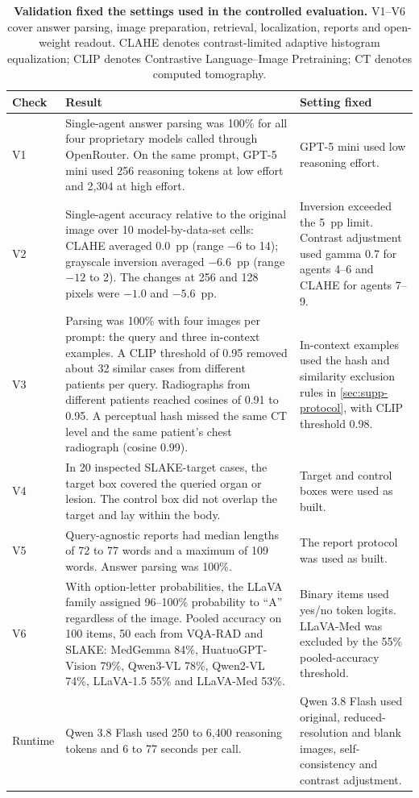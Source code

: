 \begin{table}[!htbp]
\centering
\caption{\textbf{Validation fixed the settings used in the controlled evaluation.} V1--V6 cover answer parsing, image preparation, retrieval, localization, reports and open-weight readout. CLAHE denotes contrast-limited adaptive histogram equalization; CLIP denotes Contrastive Language--Image Pretraining; CT denotes computed tomography.}
\label{tab:supp-validation}
\footnotesize
\setlength{\tabcolsep}{4pt}
\begin{tabular}{@{}p{}p{}p{}@{}}
\toprule
Check & Result & Setting fixed \\
\midrule
V1 & Single-agent answer parsing was 100\% for all four proprietary models called through OpenRouter. On the same prompt, GPT-5 mini used 256 reasoning tokens at low effort and 2,304 at high effort. & GPT-5 mini used low reasoning effort. \\[3pt]
V2 & Single-agent accuracy relative to the original image over 10 model-by-data-set cells: CLAHE averaged 0.0~pp (range $-6$ to 14); grayscale inversion averaged $-6.6$~pp (range $-12$ to 2). The changes at 256 and 128 pixels were $-1.0$ and $-5.6$~pp. & Inversion exceeded the 5~pp limit. Contrast adjustment used gamma 0.7 for agents 4--6 and CLAHE for agents 7--9. \\[3pt]
V3 & Parsing was 100\% with four images per prompt: the query and three in-context examples. A CLIP threshold of 0.95 removed about 32 similar cases from different patients per query. Radiographs from different patients reached cosines of 0.91 to 0.95. A perceptual hash missed the same CT level and the same patient's chest radiograph (cosine 0.99). & In-context examples used the hash and similarity exclusion rules in \cref{sec:supp-protocol}, with CLIP threshold 0.98. \\[3pt]
V4 & In 20 inspected SLAKE-target cases, the target box covered the queried organ or lesion. The control box did not overlap the target and lay within the body. & Target and control boxes were used as built. \\[3pt]
V5 & Query-agnostic reports had median lengths of 72 to 77 words and a maximum of 109 words. Answer parsing was 100\%. & The report protocol was used as built. \\[3pt]
V6 & With option-letter probabilities, the LLaVA family assigned 96--100\% probability to ``A'' regardless of the image. Pooled accuracy on 100 items, 50 each from VQA-RAD and SLAKE: MedGemma 84\%, HuatuoGPT-Vision 79\%, Qwen3-VL 78\%, Qwen2-VL 74\%, LLaVA-1.5 55\% and LLaVA-Med 53\%. & Binary items used yes/no token logits. LLaVA-Med was excluded by the 55\% pooled-accuracy threshold. \\[3pt]
Runtime & Qwen 3.8 Flash used 250 to 6,400 reasoning tokens and 6 to 77 seconds per call. & Qwen 3.8 Flash used original, reduced-resolution and blank images, self-consistency and contrast adjustment. \\
\bottomrule
\end{tabular}
\end{table}

